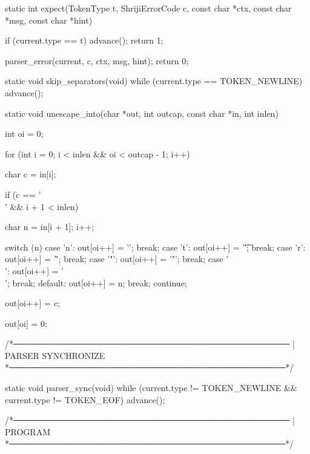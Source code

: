 \documentclass{article}
\begin{document}
static int expect(TokenType t, ShrijiErrorCode c,
                  const char *ctx, const char *msg, const char *hint)
{
    if (current.type == t) {
        advance();
        return 1;
    }

   parser_error(current, c, ctx, msg, hint);
    return 0;
}

static void skip_separators(void)
{
    while (current.type == TOKEN_NEWLINE) {
        advance();
    }
}

static void unescape_into(char *out, int outcap, const char *in, int inlen)
{
    int oi = 0;

    for (int i = 0; i < inlen && oi < outcap - 1; i++) {
        char c = in[i];

        if (c == '\\' && i + 1 < inlen) {
            char n = in[i + 1];
            i++;

            switch (n) {
                case 'n':  out[oi++] = '\n'; break;
                case 't':  out[oi++] = '\t'; break;
                case 'r':  out[oi++] = '\r'; break;
                case '"':  out[oi++] = '"';  break;
                case '\\': out[oi++] = '\\'; break;
                default:
                    out[oi++] = n;
                    break;
            }
            continue;
        }

        out[oi++] = c;
    }

    out[oi] = 0;
}






/*──────────────────────────────────────────────
 | PARSER SYNCHRONIZE
 *──────────────────────────────────────────────*/







static void parser_sync(void)
{
    while (current.type != TOKEN_NEWLINE &&
           current.type != TOKEN_EOF)
    {
        advance();
    }
}








/*──────────────────────────────────────────────
 | PROGRAM
 *──────────────────────────────────────────────*/
\end{document}
